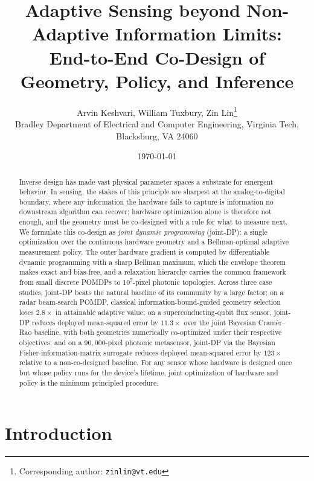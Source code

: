 \documentclass[11pt,a4paper,onecolumn]{article}
\title{Adaptive Sensing beyond Non-Adaptive Information Limits:\\
       End-to-End Co-Design of Geometry, Policy, and Inference}
\author{Arvin Keshvari, William Tuxbury, Zin Lin\thanks{Corresponding author: \texttt{zinlin@vt.edu}}\\[2pt]
\small Bradley Department of Electrical and Computer Engineering, Virginia Tech, Blacksburg, VA 24060}
\date{\today}
\begin{document}
\maketitle

\begin{abstract}
Inverse design has made vast physical parameter spaces a substrate for emergent behavior.  In sensing, the stakes of this principle are sharpest at the analog-to-digital boundary, where any information the hardware fails to capture is information no downstream algorithm can recover; hardware optimization alone is therefore not enough, and the geometry must be co-designed with a rule for what to measure next.  We formulate this co-design as \emph{joint dynamic programming} (joint-DP): a single optimization over the continuous hardware geometry and a Bellman-optimal adaptive measurement policy.  The outer hardware gradient is computed by differentiable dynamic programming with a sharp Bellman maximum, which the envelope theorem makes exact and bias-free, and a relaxation hierarchy carries the common framework from small discrete POMDPs to $10^5$-pixel photonic topologies.  Across three case studies, joint-DP beats the natural baseline of its community by a large factor: on a radar beam-search POMDP, classical information-bound-guided geometry selection loses $2.8\times$ in attainable adaptive value; on a superconducting-qubit flux sensor, joint-DP reduces deployed mean-squared error by $11.3\times$ over the joint Bayesian Cram\'er--Rao baseline, with both geometries numerically co-optimized under their respective objectives; and on a $90{,}000$-pixel photonic metasensor, joint-DP via the Bayesian Fisher-information-matrix surrogate reduces deployed mean-squared error by $123\times$ relative to a non-co-designed baseline.  For any sensor whose hardware is designed once but whose policy runs for the device's lifetime, joint optimization of hardware and policy is the minimum principled procedure.
\end{abstract}

\tableofcontents

\section{Introduction}
\label{sec:intro}
\end{document}
